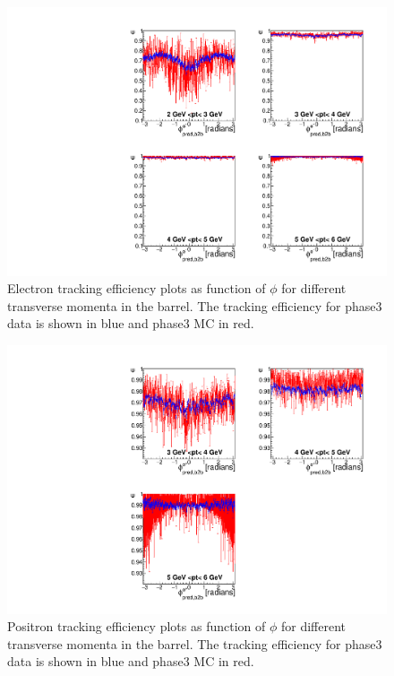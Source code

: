 \documentclass[a4paper,11pt,twosided,final,german,openbib,pdftex,listof=totoc,bibliography=totoc]{scrbook}
\begin{document}
\begin{figure}[!htbp]
	\centering
	\includegraphics[width=\textwidth]{Plots/master3/xPtMPhiemBarrelP3}
	\caption[Transverse Momentum $\phi$ Electron Barrel Efficiency Phase3]{Electron tracking efficiency plots as function of $\phi$ for different transverse momenta in the barrel. The tracking efficiency for phase3 data is shown in blue and phase3 MC in red.}
	\label{plt:xPtMPhiemBarrel3}
\end{figure}



\begin{figure}[!htbp]
	\centering
	\includegraphics[width=\textwidth]{Plots/master3/xPtMPhiepBarrelP3}
	\caption[Transverse Momentum $\phi$ Positron Barrel Efficiency Phase3]{Positron tracking efficiency plots as function of $\phi$ for different transverse momenta in the barrel. The tracking efficiency for phase3 data is shown in blue and phase3 MC in red.}
	\label{plt:xPtMPhiepBarrel3}
\end{figure}
\end{document}
